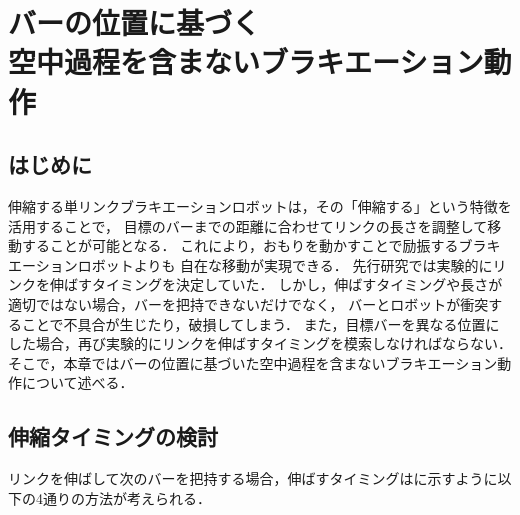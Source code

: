 \chapter[バーの位置に基づく空中過程を含まないブラキエーション動作]%
{バーの位置に基づく\\空中過程を含まないブラキエーション動作}
        \section{はじめに}
        
        伸縮する単リンクブラキエーションロボットは，その「伸縮する」という特徴を活用することで，
        目標のバーまでの距離に合わせてリンクの長さを調整して移動することが可能となる．
        これにより，おもりを動かすことで励振するブラキエーションロボット\cite{akahane2022single}よりも
        自在な移動が実現できる．
        先行研究\cite{Hijiri:Robomech2024}では実験的にリンクを伸ばすタイミングを決定していた．
        しかし，伸ばすタイミングや長さが適切ではない場合，バーを把持できないだけでなく，
        バーとロボットが衝突することで不具合が生じたり，破損してしまう．
        また，目標バーを異なる位置にした場合，再び実験的にリンクを伸ばすタイミングを模索しなければならない．
        そこで，本章ではバーの位置に基づいた空中過程を含まないブラキエーション動作について述べる．
          
        \section{伸縮タイミングの検討}

        リンクを伸ばして次のバーを把持する場合，伸ばすタイミングはに示すように以下の4通りの方法が考えられる．

